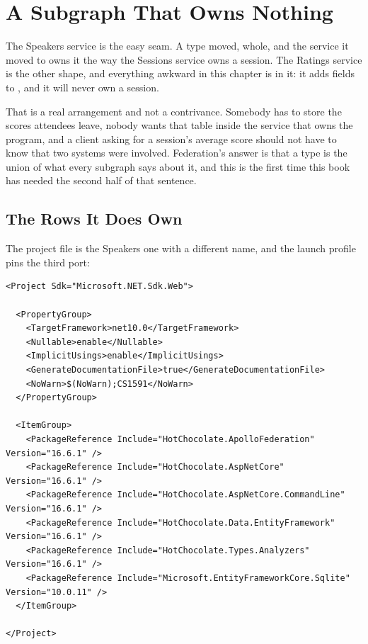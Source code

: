 \section{A Subgraph That Owns Nothing}
\label{sec:ch09-a-subgraph-that-owns-nothing}

%
The Speakers service is the easy seam. A type moved, whole, and the service it
moved to owns it the way the Sessions service owns a session. The Ratings
service is the other shape, and everything awkward in this chapter is in it: it
adds fields to , and it will never own a session.

%
That is a real arrangement and not a contrivance. Somebody has to store
the scores attendees leave, nobody wants that table inside the service that
owns the program, and a client asking for a session's average score should
not have to know that two systems were involved. Federation's answer is that a
type is the union of what every subgraph says about it, and this is the first
time this book has needed the second half of that sentence.

\subsection{The Rows It Does Own}

%
The project file is the Speakers one with a different name, and the launch
profile pins the third port:

\begin{verbatim}
<Project Sdk="Microsoft.NET.Sdk.Web">

  <PropertyGroup>
    <TargetFramework>net10.0</TargetFramework>
    <Nullable>enable</Nullable>
    <ImplicitUsings>enable</ImplicitUsings>
    <GenerateDocumentationFile>true</GenerateDocumentationFile>
    <NoWarn>$(NoWarn);CS1591</NoWarn>
  </PropertyGroup>

  <ItemGroup>
    <PackageReference Include="HotChocolate.ApolloFederation" Version="16.6.1" />
    <PackageReference Include="HotChocolate.AspNetCore" Version="16.6.1" />
    <PackageReference Include="HotChocolate.AspNetCore.CommandLine" Version="16.6.1" />
    <PackageReference Include="HotChocolate.Data.EntityFramework" Version="16.6.1" />
    <PackageReference Include="HotChocolate.Types.Analyzers" Version="16.6.1" />
    <PackageReference Include="Microsoft.EntityFrameworkCore.Sqlite" Version="10.0.11" />
  </ItemGroup>

</Project>
\end{verbatim}

